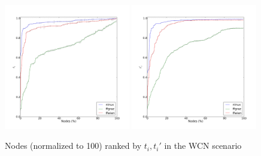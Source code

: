 \documentclass[a4paper,11pt,twoside,openright]{memoir}
\begin{document}
\begin{figure}[htb]
  \centering
  \hspace*{\fill}
  \includegraphics[width=0.49\textwidth]{graphs/all-default-Tc}
  \hfill
  \includegraphics[width=0.49\textwidth]{graphs/all-default-Rc}
  \hspace*{\fill}
  \caption{Nodes (normalized to 100) ranked by $t_i, t_i'$ in the WCN scenario}
  \label{fig:mp_wcn}
\end{figure}
\end{document}
